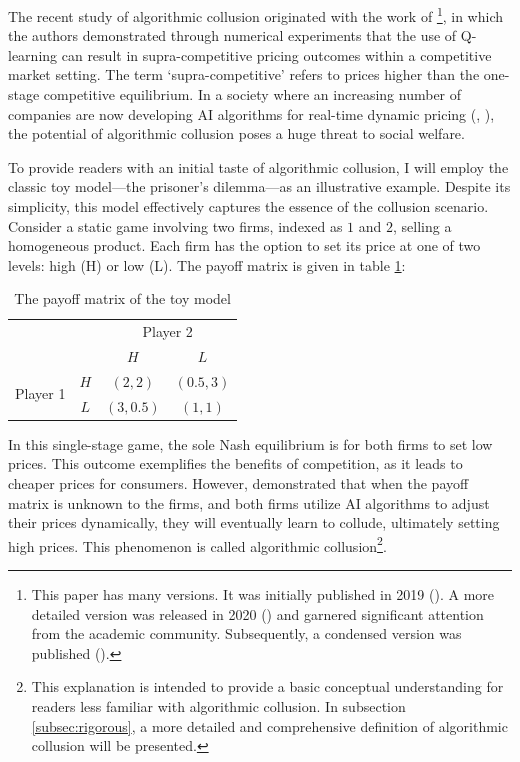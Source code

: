 \documentclass[mnsc,nonblindrev]{workingpaper}
\begin{document}
The recent study of algorithmic collusion originated with the work of \cite{calvano2020artificial}\footnote{This paper has many versions. It was initially published in 2019 (\cite{calvano2019algorithmic}). A more detailed version was released in 2020 (\cite{calvano2020artificial}) and garnered significant attention from the academic community. Subsequently, a condensed version was published (\cite{calvano2020protecting}).}, in which the authors demonstrated through numerical experiments that the use of Q-learning can result in supra-competitive pricing outcomes within a competitive market setting. The term `supra-competitive' refers to prices higher than the one-stage competitive equilibrium. In a society where an increasing number of companies are now developing AI algorithms for real-time dynamic pricing (\cite{spann2024algorithmic}, \cite{bcgDynamicPricingB2B}), the potential of algorithmic collusion poses a huge threat to social welfare.

To provide readers with an initial taste of algorithmic collusion, I will employ the classic toy model—the prisoner’s dilemma—as an illustrative example. Despite its simplicity, this model effectively captures the essence of the collusion scenario. Consider a static game involving two firms, indexed as $1$ and $2$, selling a homogeneous product. Each firm has the option to set its price at one of two levels: high (H) or low (L). The payoff matrix is given in table \ref{tab:toy_payoff_matrix}:
\begin{table}[htbp]
	\centering
	\caption{The payoff matrix of the toy model}
	\label{tab:toy_payoff_matrix}
	\begin{tabular}{cc|c|c}
                        & & \multicolumn{2}{c}{Player 2} \\
                        & & $H$ & $L$ \\
            \hline
            \multirow{2}{*}{Player 1} & $H$ & $(2,2)$ & $(0.5,3)$ \\
            \cline{2-4}
                        & $L$ & $(3,0.5)$ & $(1,1)$ \\
        \end{tabular}
\end{table}
In this single-stage game, the sole Nash equilibrium is for both firms to set low prices. This outcome exemplifies the benefits of competition, as it leads to cheaper prices for consumers. However, \cite{calvano2020artificial} demonstrated that when the payoff matrix is unknown to the firms, and both firms utilize AI algorithms to adjust their prices dynamically, they will eventually learn to collude, ultimately setting high prices. This phenomenon is called algorithmic collusion\footnote{This explanation is intended to provide a basic conceptual understanding for readers less familiar with algorithmic collusion. In subsection \ref{subsec:rigorous}, a more detailed and comprehensive definition of algorithmic collusion will be presented.}.
\end{document}
